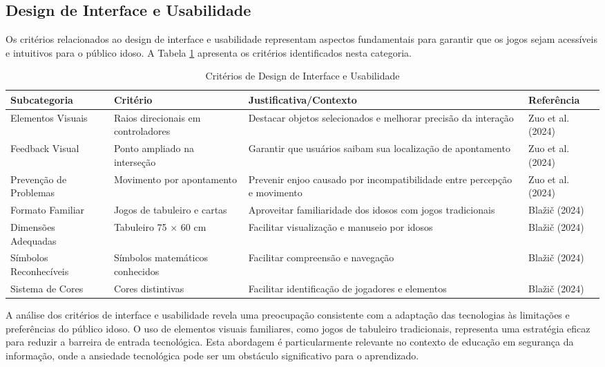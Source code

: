\subsection{Design de Interface e Usabilidade}
\label{subsec:interface_usabilidade}

Os critérios relacionados ao design de interface e usabilidade representam aspectos fundamentais para garantir que os jogos sejam acessíveis e intuitivos para o público idoso. A Tabela \ref{tab:interface_usabilidade} apresenta os critérios identificados nesta categoria.

\begin{table}[H]
\centering
\caption{Critérios de Design de Interface e Usabilidade}
\label{tab:interface_usabilidade}
\begin{tabular}{p{2.5cm}p{3cm}p{5cm}p{3cm}}
\hline
\textbf{Subcategoria} & \textbf{Critério} & \textbf{Justificativa/Contexto} & \textbf{Referência} \\ \hline
Elementos Visuais & Raios direcionais em controladores & Destacar objetos selecionados e melhorar precisão da interação & Zuo et al. (2024) \\
Feedback Visual & Ponto ampliado na interseção & Garantir que usuários saibam sua localização de apontamento & Zuo et al. (2024) \\
Prevenção de Problemas & Movimento por apontamento & Prevenir enjoo causado por incompatibilidade entre percepção e movimento & Zuo et al. (2024) \\
Formato Familiar & Jogos de tabuleiro e cartas & Aproveitar familiaridade dos idosos com jogos tradicionais & Blažič (2024) \\
Dimensões Adequadas & Tabuleiro 75 × 60 cm & Facilitar visualização e manuseio por idosos & Blažič (2024) \\
Símbolos Reconhecíveis & Símbolos matemáticos conhecidos & Facilitar compreensão e navegação & Blažič (2024) \\
Sistema de Cores & Cores distintivas & Facilitar identificação de jogadores e elementos & Blažič (2024) \\
\hline
\end{tabular}
\end{table}

A análise dos critérios de interface e usabilidade revela uma preocupação consistente com a adaptação das tecnologias às limitações e preferências do público idoso. O uso de elementos visuais familiares, como jogos de tabuleiro tradicionais, representa uma estratégia eficaz para reduzir a barreira de entrada tecnológica. Esta abordagem é particularmente relevante no contexto de educação em segurança da informação, onde a ansiedade tecnológica pode ser um obstáculo significativo para o aprendizado.

